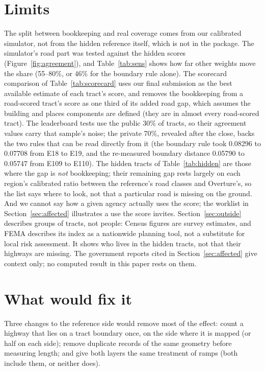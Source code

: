 \documentclass[10pt,twocolumn,a4paper]{article}
\begin{document}
\section{Limits}
\label{sec:limits}
The split between bookkeeping and real coverage comes from our calibrated simulator, not from the hidden reference
itself, which is not in the package. The simulator's road part was tested against the hidden scores
(Figure~\ref{fig:agreement}), and Table~\ref{tab:sens} shows how far other weights move the share (55--80\%, or 46\% for
the boundary rule alone). The scorecard comparison of Table~\ref{tab:scorecard} uses our final submission as the best
available estimate of each tract's score, and removes the bookkeeping from a road-scored tract's score as one third of
its added road gap, which assumes the building and places components are defined (they are in almost every road-scored
tract). The leaderboard tests use the public 30\% of tracts, so their agreement values carry that sample's noise; the private 70\%, revealed after the close, backs the two rules that
can be read directly from it (the boundary rule took 0.08296 to 0.07708 from E18 to E19, and the re-measured boundary
distance 0.05790 to 0.05747 from E109 to E110). The hidden tracts of Table~\ref{tab:hidden} are those where the gap is \emph{not} bookkeeping; their remaining
gap rests largely on each region's calibrated ratio between the reference's road classes and Overture's, so the list
says where to look, not that a particular road is missing on the ground. And we cannot say how a given agency actually
uses the score; the worklist in Section~\ref{sec:affected} illustrates a use the score invites. Section~\ref{sec:outside}
describes groups of tracts, not people: Census figures are survey estimates, and FEMA describes its index as a nationwide
planning tool, not a substitute for local risk assessment. It shows who lives in the hidden tracts, not that their
highways are missing. The government reports cited in Section~\ref{sec:affected} give context only; no computed result
in this paper rests on them.

\section{What would fix it}
\label{sec:fix}
Three changes to the reference side would remove most of the effect: count a highway that lies on a tract boundary once,
on the side where it is mapped (or half on each side); remove duplicate records of the same geometry before measuring
length; and give both layers the same treatment of ramps (both include them, or neither does).
\end{document}
